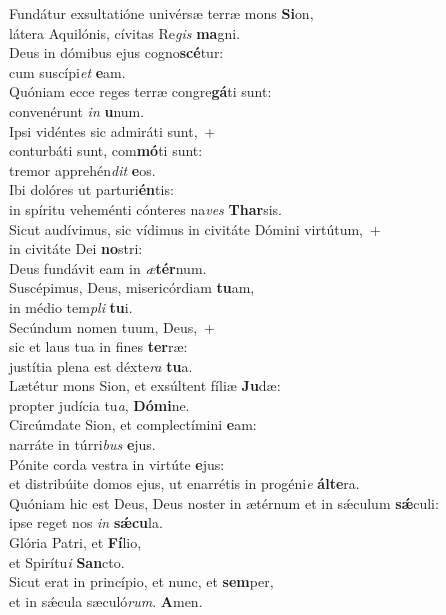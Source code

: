 \evenverse Fundátur exsultatióne univérsæ terræ mons \textbf{Si}on,~\*\\
\evenverse látera Aquilónis, cívitas Re\textit{gis} \textbf{ma}gni.\\
\oddverse Deus in dómibus ejus cogno\textbf{scé}tur:~\*\\
\oddverse cum suscípi\textit{et} \textbf{e}am.\\
\evenverse Quóniam ecce reges terræ congre\textbf{gá}ti sunt:~\*\\
\evenverse convenérunt \textit{in} \textbf{u}num.\\
\oddverse Ipsi vidéntes sic admiráti sunt,~+\\
\oddverse  conturbáti sunt, com\textbf{mó}ti sunt:~\*\\
\oddverse tremor apprehén\textit{dit} \textbf{e}os.\\
\evenverse Ibi dolóres ut parturi\textbf{én}tis:~\*\\
\evenverse in spíritu veheménti cónteres na\textit{ves} \textbf{Thar}sis.\\
\oddverse Sicut audívimus, sic vídimus in civitáte Dómini virtútum,~+\\
\oddverse  in civitáte Dei \textbf{no}stri:~\*\\
\oddverse Deus fundávit eam in \textit{æ}\textbf{tér}num.\\
\evenverse Suscépimus, Deus, misericórdiam \textbf{tu}am,~\*\\
\evenverse in médio tem\textit{pli} \textbf{tu}i.\\
\oddverse Secúndum nomen tuum, Deus,~+\\
\oddverse  sic et laus tua in fines \textbf{ter}ræ:~\*\\
\oddverse justítia plena est déxte\textit{ra} \textbf{tu}a.\\
\evenverse Lætétur mons Sion, et exsúltent fíliæ \textbf{Ju}dæ:~\*\\
\evenverse propter judícia tu\textit{a}, \textbf{Dó}\textbf{mi}ne.\\
\oddverse Circúmdate Sion, et complectímini \textbf{e}am:~\*\\
\oddverse narráte in túrri\textit{bus} \textbf{e}jus.\\
\evenverse Pónite corda vestra in virtúte \textbf{e}jus:~\*\\
\evenverse et distribúite domos ejus, ut enarrétis in progéni\textit{e} \textbf{ál}\textbf{te}ra.\\
\oddverse Quóniam hic est Deus, Deus noster in ætérnum et in sǽculum \textbf{sǽ}culi:~\*\\
\oddverse ipse reget nos \textit{in} \textbf{sǽ}\textbf{cu}la.\\
\evenverse Glória Patri, et \textbf{Fí}lio,~\*\\
\evenverse et Spirítu\textit{i} \textbf{San}cto.\\
\oddverse Sicut erat in princípio, et nunc, et \textbf{sem}per,~\*\\
\oddverse et in sǽcula sæculó\textit{rum}. \textbf{A}men.\\
